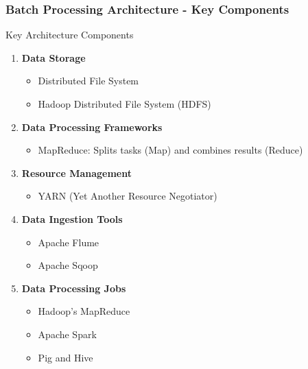\documentclass[aspectratio=169]{beamer}
\begin{document}
\begin{frame}[fragile]
    \frametitle{Batch Processing Architecture - Key Components}
    \begin{block}{Key Architecture Components}
        \begin{enumerate}
            \item \textbf{Data Storage}
                \begin{itemize}
                    \item Distributed File System
                    \item Hadoop Distributed File System (HDFS)
                \end{itemize}
            \item \textbf{Data Processing Frameworks}
                \begin{itemize}
                    \item MapReduce: Splits tasks (Map) and combines results (Reduce)
                \end{itemize}
            \item \textbf{Resource Management}
                \begin{itemize}
                    \item YARN (Yet Another Resource Negotiator)
                \end{itemize}
            \item \textbf{Data Ingestion Tools}
                \begin{itemize}
                    \item Apache Flume
                    \item Apache Sqoop
                \end{itemize}
            \item \textbf{Data Processing Jobs}
                \begin{itemize}
                    \item Hadoop's MapReduce
                    \item Apache Spark
                    \item Pig and Hive
                \end{itemize}
        \end{enumerate}
    \end{block}
\end{frame}
\end{document}
